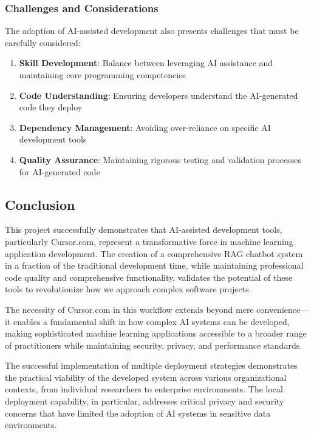 \subsubsection{Challenges and Considerations}

The adoption of AI-assisted development also presents challenges that must be carefully considered:

\begin{enumerate}
    \item \textbf{Skill Development}: Balance between leveraging AI assistance and maintaining core programming competencies
    \item \textbf{Code Understanding}: Ensuring developers understand the AI-generated code they deploy
    \item \textbf{Dependency Management}: Avoiding over-reliance on specific AI development tools
    \item \textbf{Quality Assurance}: Maintaining rigorous testing and validation processes for AI-generated code
\end{enumerate}

\subsection{Conclusion}

This project successfully demonstrates that AI-assisted development tools, particularly Cursor.com, represent a transformative force in machine learning application development. The creation of a comprehensive RAG chatbot system in a fraction of the traditional development time, while maintaining professional code quality and comprehensive functionality, validates the potential of these tools to revolutionize how we approach complex software projects.

The necessity of Cursor.com in this workflow extends beyond mere convenience—it enables a fundamental shift in how complex AI systems can be developed, making sophisticated machine learning applications accessible to a broader range of practitioners while maintaining security, privacy, and performance standards.

The successful implementation of multiple deployment strategies demonstrates the practical viability of the developed system across various organizational contexts, from individual researchers to enterprise environments. The local deployment capability, in particular, addresses critical privacy and security concerns that have limited the adoption of AI systems in sensitive data environments.

